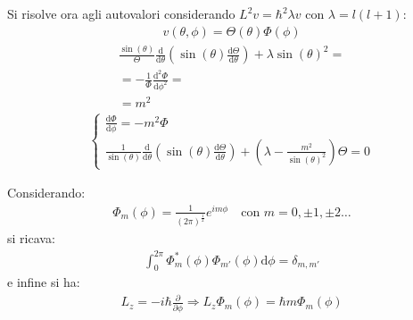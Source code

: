 Si risolve ora agli autovalori considerando $L^2v=\hbar ^2\lambda v$ con $\lambda=l\left(l+1\right)$:
\begin{equation}\begin{split}
v\left(\theta,\phi\right)=\Theta\left(\theta\right)\Phi\left(\phi\right)
\end{split}\end{equation}
\begin{equation}\begin{split}
\frac{\sin{\left(\theta\right)}}{\Theta}\frac{\textrm{d}}{\textrm{d}\theta}\left(\sin{\left(\theta\right)}\frac{\textrm{d}\Theta}{\textrm{d}\theta}\right)+\lambda\sin{\left(\theta\right)}^2=\\
=-\frac{1}{\Phi}\frac{\textrm{d}^2\Phi}{\textrm{d}\phi^2}=\\
=m^2
\end{split}\end{equation}
\begin{equation}\begin{split}
\begin{cases}
\frac{\textrm{d}\Phi}{\textrm{d}\phi}=-m^2\Phi \\
\frac{1}{\sin{\left(\theta\right)}}\frac{\textrm{d}}{\textrm{d}\theta}\left(\sin{\left(\theta\right)}\frac{\textrm{d}\Theta}{\textrm{d}\theta}\right)+\left(\lambda-\frac{m^2}{\sin{\left(\theta\right)}^2}\right)\Theta=0
\end{cases}
\end{split}\end{equation}

Considerando:
\begin{equation}\begin{split}
\Phi_m\left(\phi\right)=\frac{1}{\left(2\pi\right)^{\frac{1}{2}}}e^{im\phi} \quad \textrm{con } m=0,\pm 1, \pm 2 \dots
\end{split}\end{equation}
si ricava:
\begin{equation}\begin{split}
\int_0^{2\pi}{\Phi_m^*\left(\phi\right)\Phi_{m'}\left(\phi\right)\textrm{d}\phi}=\delta_{m,m'}
\end{split}\end{equation}
e infine si ha:
\begin{equation}\begin{split}
L_z=-i\hbar \frac{\partial }{\partial \phi} \Longrightarrow L_z\Phi_m\left(\phi\right)=\hbar m\Phi_m\left(\phi\right)
\end{split}\end{equation}

